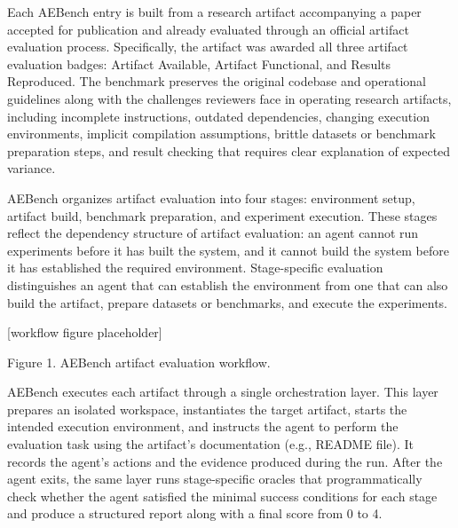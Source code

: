 Each AEBench entry is built from a research artifact accompanying a paper accepted for publication and already evaluated through an official artifact evaluation process. Specifically, the artifact was awarded all three artifact evaluation badges: Artifact Available, Artifact Functional, and Results Reproduced. The benchmark preserves the original codebase and operational guidelines along with the challenges reviewers face in operating research artifacts, including incomplete instructions, outdated dependencies, changing execution environments, implicit compilation assumptions, brittle datasets or benchmark preparation steps, and result checking that requires clear explanation of expected variance.

AEBench organizes artifact evaluation into four stages: environment setup, artifact build, benchmark preparation, and experiment execution. These stages reflect the dependency structure of artifact evaluation: an agent cannot run experiments before it has built the system, and it cannot build the system before it has established the required environment. Stage-specific evaluation distinguishes an agent that can establish the environment from one that can also build the artifact, prepare datasets or benchmarks, and execute the experiments.

[workflow figure placeholder]

Figure 1. AEBench artifact evaluation workflow.

AEBench executes each artifact through a single orchestration layer. This layer prepares an isolated workspace, instantiates the target artifact, starts the intended execution environment, and instructs the agent to perform the evaluation task using the artifact's documentation (e.g., README file). It records the agent's actions and the evidence produced during the run. After the agent exits, the same layer runs stage-specific oracles that programmatically check whether the agent satisfied the minimal success conditions for each stage and produce a structured report along with a final score from 0 to 4.

